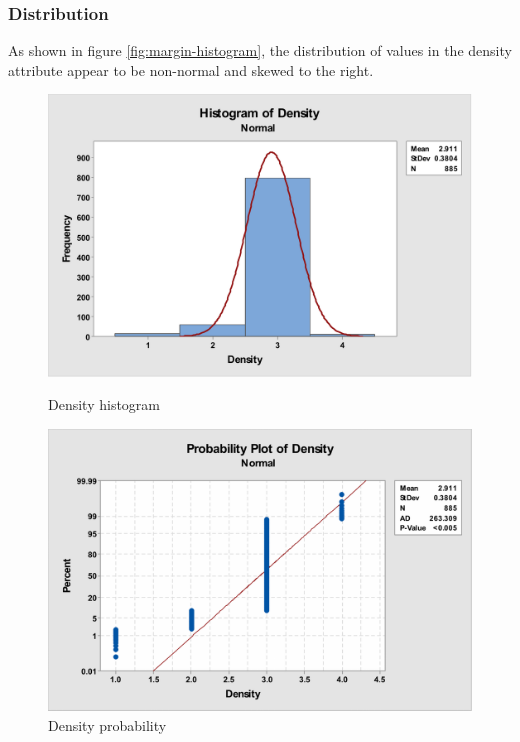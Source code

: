 \documentclass[12pt]{article}
\begin{document}
      \subsubsection{Distribution}
        As shown in figure \ref{fig:margin-histogram}, the distribution of values in the density attribute appear to be non-normal and skewed to the right.

        \begin{figure}[H]
          \centering
          \begin{minipage}[b]{0.45\textwidth}
            \includegraphics[width=\textwidth]{density-histogram}
            \caption{Density histogram}
            \label{fig:density-histogram}
          \end{minipage}
          \hfill
          \begin{minipage}[b]{0.45\textwidth}
            \includegraphics[width=\textwidth]{density-probability}
            \caption{Density probability}
            \label{fig:density-probability}
          \end{minipage}
        \end{figure}
\end{document}
